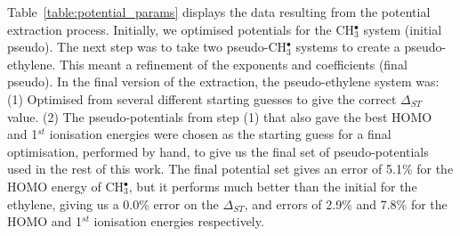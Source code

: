 \documentclass[12pt]{article}
\begin{document}
Table~\ref{table:potential_params} displays the data resulting from the potential extraction process. 
Initially, we optimised potentials for the CH$_3^\bullet$ system (initial pseudo).
The next step was to take two pseudo-CH\(^{\bullet}_{3}\) systems to create a pseudo-ethylene. 
This meant a refinement of the exponents and coefficients (final pseudo).
In the final version of the extraction, the pseudo-ethylene system was: (1) Optimised from several different starting guesses to give the correct $\Delta_{ST}$ value. (2) The pseudo-potentials from step (1) that also gave the best HOMO and 1$^{st}$ ionisation energies were chosen as the starting guess for a final optimisation, performed by hand, to give us the final set of pseudo-potentials used in the rest of this work.
The final potential set gives an error of 5.1\% for the HOMO energy of CH\(^{\bullet}_{3}\), but it
performs much better than the initial for the ethylene,
giving us a 0.0\% error on the $\Delta_{ST}$, and errors of 2.9\% and 7.8\% for the HOMO and 1$^{st}$ ionisation energies respectively.
\end{document}
